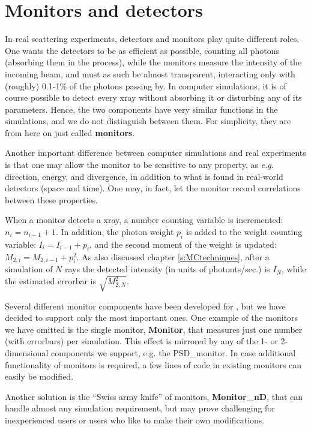 \chapter{Monitors and detectors}

In real scattering experiments, detectors and monitors play quite
different roles. One wants the detectors to be as efficient as
possible, counting all photons (absorbing them in the process),
while the monitors measure the intensity of the incoming beam, and must
as such be almost transparent, interacting only with (roughly) 0.1-1\%
of the photons passing by. In computer simulations, it is
of course possible to detect every xray without
absorbing it or disturbing any of its parameters. Hence, the two components
have very similar functions in the simulations, and we do
not distinguish between them. For simplicity, they are from here on
just called {\bf monitors}.

Another important difference between computer simulations
and real experiments is
that one may allow the monitor to be sensitive to any \xray property,
as {\em e.g.} direction, energy, and divergence, in addition to what
is found in real-world detectors (space and time). One may, in
fact, let the monitor    record correlations between these properties.

When a monitor detects a xray,
a number counting variable is incremented: $n_i = n_{i-1}+1$.
In addition, the photon
weight $p_i$ is added to the weight counting variable:
$I_i = I_{i-1} + p_i$,
and the second moment of the weight is
updated: $M_{2,i} = M_{2,i-1} + p_i^2$.
As also discussed chapter \ref{s:MCtechniques}, after a simulation of $N$ rays
the detected intensity (in units of photonts/sec.) is $I_N$,
while the estimated errorbar is $\sqrt{M_{2,N}^2}$.

Several different monitor components have been developed for
\MCX , but we have decided to support only the most important ones.
One example of the monitors we have omitted is the single monitor,
{\bf Monitor},
that measures just one number (with errorbars) per simulation.
This effect is mirrored by any of the 1- or 2-dimensional components
we support, e.g. the {\rm PSD\_monitor}.
In case additional functionality of monitors is required,
a few lines of code in existing monitors can easily be modified.

Another solution is the ``Swiss army knife'' of monitors, {\bf Monitor\_nD}, that can handle
almost any simulation requirement, but may prove challenging for inexperienced users or users who like to make their own modifications.

\newpage














\newpage

